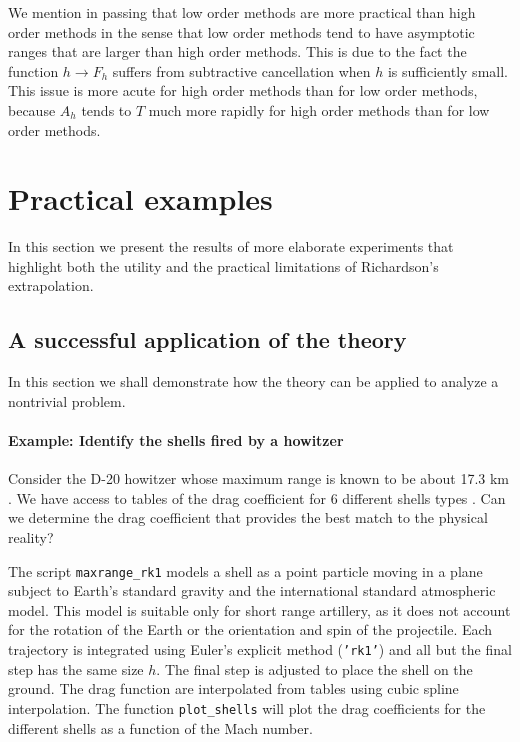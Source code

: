 \documentclass[runningheads]{llncs}
\begin{document}
We mention in passing that low order methods are more practical than high order methods in the sense that low order methods tend to have asymptotic ranges that are larger than high order methods.
This is due to the fact the function $h \rightarrow F_h$ suffers from subtractive cancellation when $h$ is sufficiently small. This issue is more acute for high order methods than for low order methods, because $A_h$ tends to $T$ much more rapidly for high order methods than for low order methods.


\section{Practical examples}

In this section we present the results of more elaborate experiments that highlight both the utility and the practical limitations of Richardson's extrapolation.

\subsection{A successful application of the theory}

In this section we shall demonstrate how the theory can be applied to analyze a nontrivial problem.

\paragraph{Example: Identify the shells fired by a howitzer}

Consider the D-20 howitzer whose maximum range is known to be about 17.3 km \cite{foss1976artillery}. We have access to tables of the drag coefficient for 6 different shells types \cite{jbmballistics}. Can we determine the drag coefficient that provides the best match to the physical reality?

The script {\tt maxrange\_rk1} models a shell as a point particle moving in a plane subject to Earth's standard gravity and the international standard atmospheric model. This model is suitable only for short range artillery, as it does not account for the rotation of the Earth or the orientation and spin of the projectile. Each trajectory is integrated using Euler's explicit method ({\tt 'rk1'}) and all but the final step has the same size $h$. The final step is adjusted to place the shell on the ground. The drag function are interpolated from tables using cubic spline interpolation. The function {\tt plot\_shells} will plot the drag coefficients for the different shells as a function of the Mach number.
\end{document}
